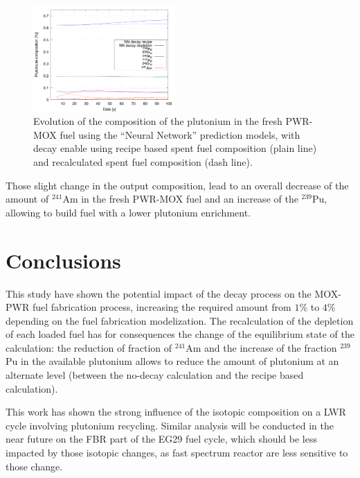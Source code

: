 \documentclass{anstrans}
\begin{document}
\begin{figure}[ht] %
  \centering
  \includegraphics[width=0.48\textwidth]{MOX_pu_composition.png}
  \caption{Evolution of the composition of the plutonium in the fresh PWR-MOX fuel
  using the ``Neural Network'' prediction models, with decay enable using recipe
based spent fuel composition (plain line) and recalculated spent fuel
composition (dash line).}
  \label{fig:depletioncompo}
\end{figure}

Those slight change in the output composition, lead to an overall decrease of
the amount of $^{241}$Am in the fresh PWR-MOX fuel and an increase of the
$^{239}$Pu, allowing to build fuel with a lower plutonium enrichment.


\section{Conclusions}

This study have shown the potential impact of the decay process on the MOX-PWR fuel
fabrication process, increasing the required amount from $1\%$ to $4\%$
depending on the fuel fabrication modelization. The recalculation of the 
depletion of each loaded fuel has for consequences the change of the equilibrium
state of the calculation: the reduction of fraction of $^{241}$Am and the increase of the
fraction $^{239}$Pu in the available plutonium allows to reduce the amount of
plutonium at an alternate level (between the no-decay calculation and the recipe
based calculation). 

This work has shown the strong influence of the isotopic composition on a LWR
cycle involving plutonium recycling. Similar analysis will be conducted in the
near future on the FBR part of the EG29 fuel cycle, which should be less
impacted by those isotopic changes, as fast spectrum reactor are less sensitive
to those change.
\end{document}
